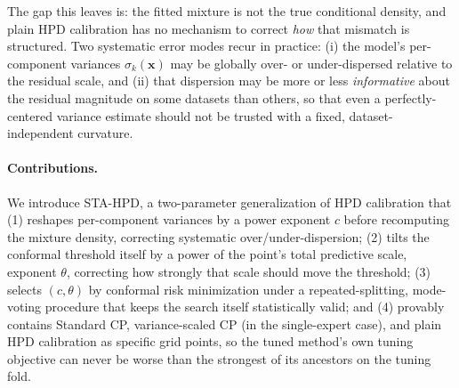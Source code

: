 \documentclass[10pt,twocolumn,a4paper]{article}
\begin{document}
The gap this leaves is: the fitted mixture is not the true conditional density, and plain HPD
calibration has no mechanism to correct \emph{how} that mismatch is structured. Two systematic
error modes recur in practice: (i) the model's per-component variances $\sigma_k(\bm x)$ may be
globally over- or under-dispersed relative to the residual scale, and (ii) that dispersion may be
more or less \emph{informative} about the residual magnitude on some datasets than others, so that
even a perfectly-centered variance estimate should not be trusted with a fixed, dataset-independent
curvature.

\paragraph{Contributions.} We introduce STA-HPD, a two-parameter generalization of HPD calibration
that (1) reshapes per-component variances by a power exponent $c$ before recomputing the mixture
density, correcting systematic over/under-dispersion; (2) tilts the conformal threshold itself by a
power of the point's total predictive scale, exponent $\theta$, correcting how strongly that scale
should move the threshold; (3) selects $(c,\theta)$ by conformal risk minimization under a
repeated-splitting, mode-voting procedure that keeps the search itself statistically valid; and (4)
provably contains Standard CP, variance-scaled CP (in the single-expert case), and plain HPD
calibration as specific grid points, so the tuned method's own tuning objective can never be worse
than the strongest of its ancestors on the tuning fold.

\end{document}
